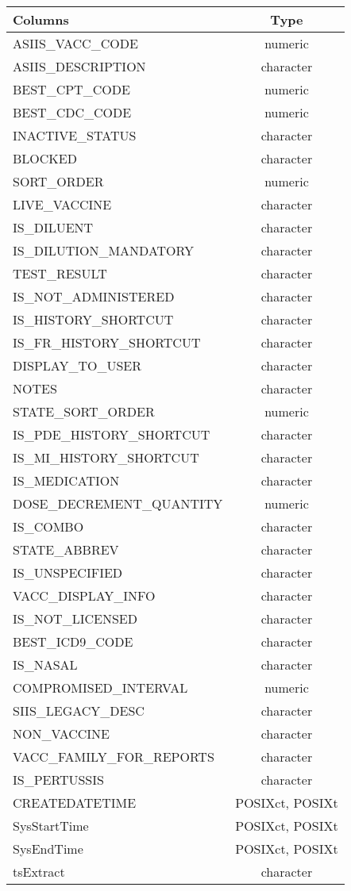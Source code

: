\documentclass[
  letterpaper,
  DIV=11,
  numbers=noendperiod]{scrreprt}
\begin{document}
\begin{longtable}{lc}
\toprule
Columns & Type \\ 
\midrule
ASIIS\_VACC\_CODE & numeric \\ 
ASIIS\_DESCRIPTION & character \\ 
BEST\_CPT\_CODE & numeric \\ 
BEST\_CDC\_CODE & numeric \\ 
INACTIVE\_STATUS & character \\ 
BLOCKED & character \\ 
SORT\_ORDER & numeric \\ 
LIVE\_VACCINE & character \\ 
IS\_DILUENT & character \\ 
IS\_DILUTION\_MANDATORY & character \\ 
TEST\_RESULT & character \\ 
IS\_NOT\_ADMINISTERED & character \\ 
IS\_HISTORY\_SHORTCUT & character \\ 
IS\_FR\_HISTORY\_SHORTCUT & character \\ 
DISPLAY\_TO\_USER & character \\ 
NOTES & character \\ 
STATE\_SORT\_ORDER & numeric \\ 
IS\_PDE\_HISTORY\_SHORTCUT & character \\ 
IS\_MI\_HISTORY\_SHORTCUT & character \\ 
IS\_MEDICATION & character \\ 
DOSE\_DECREMENT\_QUANTITY & numeric \\ 
IS\_COMBO & character \\ 
STATE\_ABBREV & character \\ 
IS\_UNSPECIFIED & character \\ 
VACC\_DISPLAY\_INFO & character \\ 
IS\_NOT\_LICENSED & character \\ 
BEST\_ICD9\_CODE & character \\ 
IS\_NASAL & character \\ 
COMPROMISED\_INTERVAL & numeric \\ 
SIIS\_LEGACY\_DESC & character \\ 
NON\_VACCINE & character \\ 
VACC\_FAMILY\_FOR\_REPORTS & character \\ 
IS\_PERTUSSIS & character \\ 
CREATEDATETIME & POSIXct, POSIXt \\ 
SysStartTime & POSIXct, POSIXt \\ 
SysEndTime & POSIXct, POSIXt \\ 
tsExtract & character \\ 
\bottomrule
\end{longtable}
\end{document}
